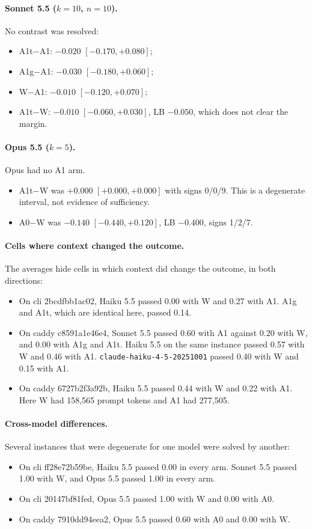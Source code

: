 \paragraph{Sonnet 5.5 ($k=10$, $n=10$).} No contrast was resolved:
\begin{itemize}
\item A1t$-$A1: $-0.020$ $[-0.170, +0.080]$;
\item A1g$-$A1: $-0.030$ $[-0.180, +0.060]$;
\item W$-$A1: $-0.010$ $[-0.120, +0.070]$;
\item A1t$-$W: $-0.010$ $[-0.060, +0.030]$, LB $-0.050$, which does not clear the margin.
\end{itemize}

\paragraph{Opus 5.5 ($k=5$).} Opus had no A1 arm.
\begin{itemize}
\item A1t$-$W was $+0.000$ $[+0.000, +0.000]$ with signs 0/0/9. This is a degenerate interval, not evidence of sufficiency.
\item A0$-$W was $-0.140$ $[-0.440, +0.120]$, LB $-0.400$, signs 1/2/7.
\end{itemize}

\paragraph{Cells where context changed the outcome.} The averages hide cells in which context did change the outcome, in both directions:
\begin{itemize}
\item On cli 2bcdfbb1ac02, Haiku 5.5 passed 0.00 with W and 0.27 with A1. A1g and A1t, which are identical here, passed 0.14.
\item On caddy c8591a1e46e4, Sonnet 5.5 passed 0.60 with A1 against 0.20 with W, and 0.00 with A1g and A1t. Haiku 5.5 on the same instance passed 0.57 with W and 0.46 with A1. \texttt{claude-haiku-4-5-20251001} passed 0.40 with W and 0.15 with A1.
\item On caddy 6727b2f3a92b, Haiku 5.5 passed 0.44 with W and 0.22 with A1. Here W had 158,565 prompt tokens and A1 had 277,505.
\end{itemize}

\paragraph{Cross-model differences.} Several instances that were degenerate for one model were solved by another:
\begin{itemize}
\item On cli ff28e72b59be, Haiku 5.5 passed 0.00 in every arm. Sonnet 5.5 passed 1.00 with W, and Opus 5.5 passed 1.00 in every arm.
\item On cli 20147bf81fed, Opus 5.5 passed 1.00 with W and 0.00 with A0.
\item On caddy 7910dd94eea2, Opus 5.5 passed 0.60 with A0 and 0.00 with W.
\end{itemize}

